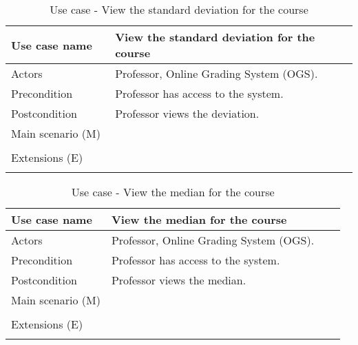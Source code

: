 \documentclass[12pt]{article}
\newcommand\tabularhead[1]{
\begin{table}[h]
  \caption{Use case - #1}
  \begin{tabular}{|p{0.3\linewidth}|p{0.7\linewidth}|}
    \hline
    \textbf{Use case name} & \textbf{#1} \\
    \hline}
\newcommand\addrow[2]{#1 &#2\\ \hline}
\newcommand\adddoublerow[2]{\begin{minipage}[t][][t]{2.5cm}#1\end{minipage}%
    &\begin{minipage}[t][][t]{\linewidth}
     \begin{itemize}\setlength{\itemsep}{0pt}%
        #2     
     \end{itemize}
     \end{minipage}\\ \hline}
\newcommand\addmulrow[2]{ \begin{minipage}[t][][t]{2.5cm}#1\end{minipage}%
     &\begin{minipage}[t][][t]{\linewidth}
      \begin{enumerate}\setlength{\itemsep}{0pt}%
        #2   
      \end{enumerate}
      \end{minipage}\\ \hline}
\newenvironment{usecase}{\tabularhead}
{\hline\end{tabular}\end{table}}
\begin{document}
\begin{usecase}{View the standard deviation for the course}
    \addrow{Actors}{Professor, Online Grading System (OGS).}
    \addrow{Precondition}{Professor has access to the system.}
    \addrow{Postcondition}{Professor views the deviation.}
    \addmulrow{Main scenario (M)}{
        \item Professor logins to the system.
        \item The system shows the list of available courses.
        \item Professor chooses the course to view.
        \item The system shows the course statistics.
        \item Professor views the standard deviation for the course.\\
    }
    \adddoublerow{Extensions (E)}{
        \item[] 1.1. Professor entered the wrong credentials.
        \item[] 1.2. Go to 1.\\
    }
\end{usecase}
\newpage
\begin{usecase}{View the median for the course}
    \addrow{Actors}{Professor, Online Grading System (OGS).}
    \addrow{Precondition}{Professor has access to the system.}
    \addrow{Postcondition}{Professor views the median.}
    \addmulrow{Main scenario (M)}{
        \item Professor logins to the system.
        \item The system shows the list of available courses.
        \item Professor chooses the course to view.
        \item The system shows the course statistics.
        \item Professor views the median.\\
    }
    \adddoublerow{Extensions (E)}{
        \item[] 1.1. Professor entered the wrong credentials.
        \item[] 1.2. Go to 1.\\
    }
\end{usecase}
\end{document}
